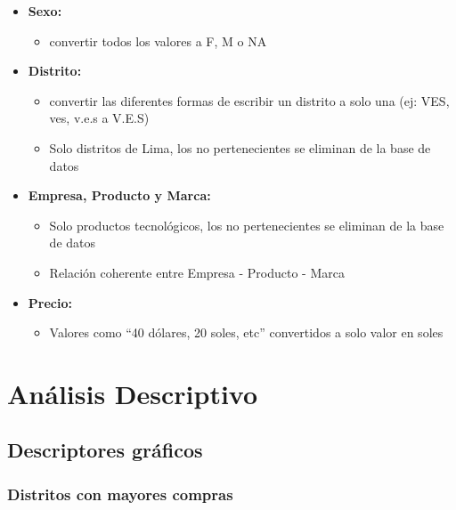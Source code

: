 \documentclass[
]{article}
\providecommand{\tightlist}{%
  \setlength{\itemsep}{0pt}\setlength{\parskip}{0pt}}
\begin{document}
\begin{itemize}
\item
  \textbf{Sexo:}

  \begin{itemize}
  \tightlist
  \item
    convertir todos los valores a F, M o NA
  \end{itemize}
\item
  \textbf{Distrito:}

  \begin{itemize}
  \item
    convertir las diferentes formas de escribir un distrito a solo una
    (ej: VES, ves, v.e.s a V.E.S)
  \item
    Solo distritos de Lima, los no pertenecientes se eliminan de la base
    de datos
  \end{itemize}
\item
  \textbf{Empresa, Producto y Marca:}

  \begin{itemize}
  \item
    Solo productos tecnológicos, los no pertenecientes se eliminan de la
    base de datos
  \item
    Relación coherente entre Empresa - Producto - Marca
  \end{itemize}
\item
  \textbf{Precio:}

  \begin{itemize}
  \tightlist
  \item
    Valores como ``40 dólares, 20 soles, etc'' convertidos a solo valor
    en soles
  \end{itemize}
\end{itemize}

\hypertarget{anuxe1lisis-descriptivo}{%
\section{\texorpdfstring{\textbf{Análisis
Descriptivo}}{Análisis Descriptivo}}\label{anuxe1lisis-descriptivo}}

\hypertarget{descriptores-gruxe1ficos}{%
\subsection{\texorpdfstring{\textbf{Descriptores
gráficos}}{Descriptores gráficos}}\label{descriptores-gruxe1ficos}}

\hypertarget{distritos-con-mayores-compras}{%
\subsubsection{\texorpdfstring{\textbf{Distritos con mayores
compras}}{Distritos con mayores compras}}\label{distritos-con-mayores-compras}}
\end{document}
